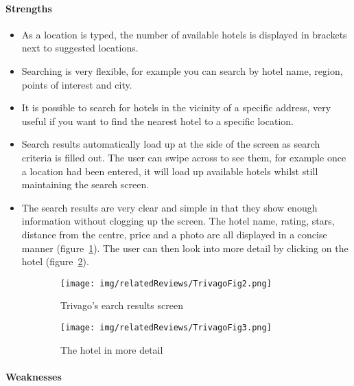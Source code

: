 
\paragraph{Strengths}
\begin{itemize}
	\item As a location is typed, the number of available hotels is displayed
		in brackets next to suggested locations.
	\item Searching is very flexible, for example you can search by hotel name,
		region, points of interest and city.
	\item It is possible to search for hotels in the vicinity of a specific
		address, very useful if you want to find the nearest hotel to a
		specific location.
	\item Search results automatically load up at the side of the screen as
		search criteria is filled out. The user can swipe across to see them,
		for example once a location had been entered, it will load up available
		hotels whilst still maintaining the search screen.
	\item The search results are very clear and simple in that they show enough
		information without clogging up the screen. The hotel name, rating,
		stars, distance from the centre, price and a photo are all displayed in
		a concise manner (figure~\ref{fig:TrivagoFig2}). The user can then look
		into more detail by clicking on the hotel
		(figure~\ref{fig:TrivagoFig3}).
\end{itemize}
\begin{figure}[htbp]
	\centering
	\begin{subfigure}[b]{0.33\textwidth}
		\texttt{[image: img/relatedReviews/TrivagoFig2.png]}
		\caption{Trivago's earch results screen}\label{fig:TrivagoFig2}
	\end{subfigure}%
	\qquad
	\begin{subfigure}[b]{0.33\textwidth}
		\texttt{[image: img/relatedReviews/TrivagoFig3.png]}
		\caption{The hotel in more detail}\label{fig:TrivagoFig3}
	\end{subfigure}
	\caption{}\label{fig:trivago2}
\end{figure}

\paragraph{Weaknesses}

